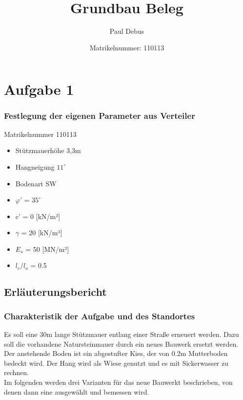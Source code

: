 \documentclass[11pt,fleqn,a4paper]{article}
\title{Grundbau Beleg}
\author{Paul Debus \and Matrikelnummer: 110113}
\begin{document}
\maketitle


\tableofcontents
\newpage
{}
\section{Aufgabe 1}
\subsubsection*{Festlegung der eigenen Parameter aus Verteiler}
Matrikelnummer 110113
\begin{itemize}
\item Stützmauerhöhe 3,3m
\item Hangneigung $11^\circ$
\item Bodenart SW
\item $\varphi $' = $35^\circ$
\item c' = 0 [kN/m²]
\item $\gamma$ = 20 [kN/m³]
\item $E_s$ = 50 [MN/m²]
\item $l_c/l_o$ = 0.5
\end{itemize}
\subsection{Erläuterungsbericht}
\subsubsection*{Charakteristik der Aufgabe und des Standortes}
Es soll eine 30m lange Stützmauer entlang einer Straße erneuert werden. Dazu soll die vorhandene Natursteinmauer durch ein neues Bauwerk ersetzt werden. Der anstehende Boden ist ein abgestufter Kies, der von 0.2m Mutterboden bedeckt wird. Der Hang wird als Wiese genutzt und es mit Sickerwasser zu rechnen. \\
Im folgenden werden drei Varianten für das neue Bauwerkt beschrieben, von denen dann eine ausgewählt und bemessen wird.
\end{document}
